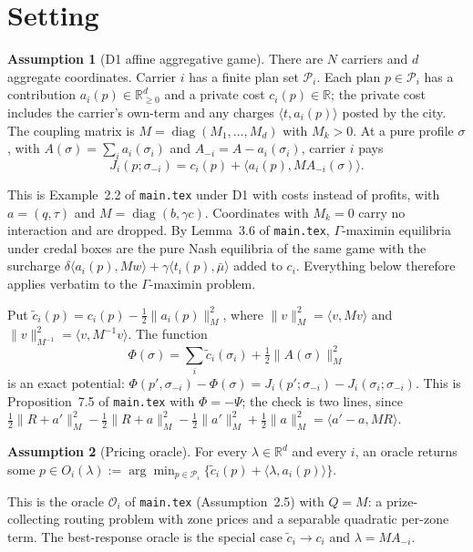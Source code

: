 \documentclass[11pt]{article}
\theoremstyle{definition}
\newtheorem{assumption}{Assumption}
\theoremstyle{remark}
\newcommand{\R}{\mathbb{R}}
\newcommand{\cP}{\mathcal{P}}
\newcommand{\ip}[2]{\langle #1,#2\rangle}
\begin{document}
\section{Setting}\label{sec:setting}

\begin{assumption}[D1 affine aggregative game]\label{ass:game}
There are $N$ carriers and $d$ aggregate coordinates. Carrier $i$ has a finite plan set $\cP_i$. Each plan $p\in\cP_i$ has a contribution $a_i(p)\in\R^d_{\ge0}$ and a private cost $c_i(p)\in\R$; the private cost includes the carrier's own-term and any charges $\ip{t}{a_i(p)}$ posted by the city. The coupling matrix is $M=\operatorname{diag}(M_1,\dots,M_d)$ with $M_k>0$. At a pure profile $\sigma$, with $A(\sigma)=\sum_ia_i(\sigma_i)$ and $A_{-i}=A-a_i(\sigma_i)$, carrier $i$ pays
\[J_i(p;\sigma_{-i})=c_i(p)+\ip{a_i(p)}{MA_{-i}(\sigma)}.\]
\end{assumption}

This is Example~2.2 of \texttt{main.tex} under D1 with costs instead of profits, with $a=(q,\tau)$ and $M=\operatorname{diag}(b,\gamma c)$. Coordinates with $M_k=0$ carry no interaction and are dropped. By Lemma~3.6 of \texttt{main.tex}, $\Gamma$-maximin equilibria under credal boxes are the pure Nash equilibria of the same game with the surcharge $\delta\ip{a_i(p)}{Mw}+\gamma\ip{t_i(p)}{\bar\mu}$ added to $c_i$. Everything below therefore applies verbatim to the $\Gamma$-maximin problem.

Put $\tilde c_i(p)=c_i(p)-\tfrac12\|a_i(p)\|_M^2$, where $\|v\|_M^2=\ip{v}{Mv}$ and $\|v\|^2_{M^{-1}}=\ip{v}{M^{-1}v}$. The function
\[\Phi(\sigma)=\sum_i\tilde c_i(\sigma_i)+\tfrac12\|A(\sigma)\|_M^2\]
is an exact potential: $\Phi(p',\sigma_{-i})-\Phi(\sigma)=J_i(p';\sigma_{-i})-J_i(\sigma_i;\sigma_{-i})$. This is Proposition~7.5 of \texttt{main.tex} with $\Phi=-\Psi$; the check is two lines, since $\tfrac12\|R+a'\|^2_M-\tfrac12\|R+a\|^2_M-\tfrac12\|a'\|^2_M+\tfrac12\|a\|_M^2=\ip{a'-a}{MR}$.

\begin{assumption}[Pricing oracle]\label{ass:oracle}
For every $\lambda\in\R^d$ and every $i$, an oracle returns some $p\in O_i(\lambda):=\arg\min_{p\in\cP_i}\{\tilde c_i(p)+\ip{\lambda}{a_i(p)}\}$.
\end{assumption}

This is the oracle $\mathcal O_i$ of \texttt{main.tex} (Assumption~2.5) with $Q=M$: a prize-collecting routing problem with zone prices and a separable quadratic per-zone term. The best-response oracle is the special case $\tilde c_i\to c_i$ and $\lambda=MA_{-i}$.
\end{document}
